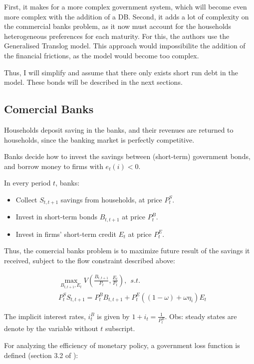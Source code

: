 \documentclass[12pt]{article}
\begin{document}
First, it makes for a more complex government system, which will become even more complex with the addition of a DB. Second, it adds a lot of complexity on the commercial banks problem, as it now must account for the households heterogeneous preferences for each maturity. For this, the authors use the Generalised Translog model. This approach would impossibilite the addition of the financial frictions, as the model would become too complex.

Thus, I will simplify and assume that there only exists short run debt in the model. These bonds will be described in the next sections.


\subsection{Comercial Banks}

Households deposit saving in the banks, and their revenues are returned to households, since the banking market is perfectly competitive.

Banks decide how to invest the savings between (short-term) government bonds, and borrow money to firms with $e_t(i) < 0$.

In every period $t$, banks:

\begin{itemize}
    \item Collect $S_{t,t+1}$ savings from households, at price $P^S_t$.
    \item Invest in short-term bonds $B_{t,t+1}$ at price $P^B_t$.
    \item Invest in firms' short-term credit $E_t$ at price $P^E_t$.
\end{itemize}

Thus, the comercial banks problem is to maximize future result of the savings it received, subject to the flow constraint described above:

\begin{align*}
    &\max_{B_{t,t+1},E_{t}}V\left({\frac{B_{t,t+1}}{P_{t}}},{\frac{E_{t}}{P_{t}}}\right), ~~ s.t.\\
    &P^S_tS_{t,t+1} = P^B_tB_{t,t+1} + P^E_t((1 - \omega) + \omega\eta_i)E_{t}
\end{align*}

The implicit interest rates, $i_t^B$ is given by $1 + i_t = \frac{1}{P^B_t}$. Obs: steady states are denote by the variable without $t$ subscript.

For analyzing the efficiency of monetary policy, a government loss function is defined (section 3.2 of \cite{ellison_2014}):
\end{document}
